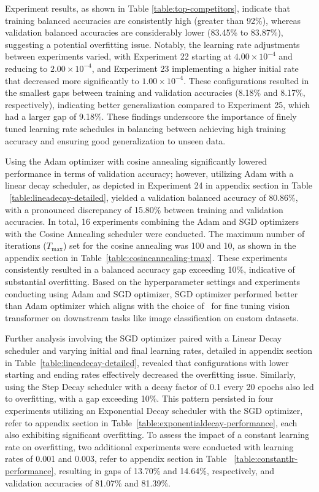 Experiment results, as shown in Table \ref{table:top-competitors}, indicate that training balanced accuracies are consistently high (greater than 92\%), whereas validation balanced accuracies are considerably lower (83.45\% to 83.87\%), suggesting a potential overfitting issue. Notably, the learning rate adjustments between experiments varied, with Experiment 22 starting at $4.00 \times 10^{-4}$ and reducing to $2.00 \times 10^{-4}$, and Experiment 23 implementing a higher initial rate that decreased more significantly to $1.00 \times 10^{-4}$. These configurations resulted in the smallest gaps between training and validation accuracies (8.18\% and 8.17\%, respectively), indicating better generalization compared to Experiment 25, which had a larger gap of 9.18\%. These findings underscore the importance of finely tuned learning rate schedules in balancing between achieving high training accuracy and ensuring good generalization to unseen data.

Using the Adam optimizer with cosine annealing significantly lowered performance in terms of validation accuracy; however, utilizing Adam with a linear decay scheduler, as depicted in Experiment 24 in appendix section in Table ~\ref{table:lineadecay-detailed}, yielded a validation balanced accuracy of 80.86\%, with a pronounced discrepancy of 15.80\% between training and validation accuracies. In total, 16 experiments combining the Adam and SGD optimizers with the Cosine Annealing scheduler were conducted. The maximum number of iterations (\(T_{\text{max}}\)) set for the cosine annealing was 100 and 10, as shown in the appendix section in Table~\ref{table:cosineannealing-tmax}. These experiments consistently resulted in a balanced accuracy gap exceeding 10\%, indicative of substantial overfitting. Based on the hyperparameter settings and experiments conducting using Adam and SGD optimizer, SGD optimizer performed better than Adam optimizer which aligns with the choice of~\citep{Vit_Paper_Dosovitskiy2020AnII} for fine tuning vision transformer on downstream tasks like image classification on custom datasets.

Further analysis involving the SGD optimizer paired with a Linear Decay scheduler and varying initial and final learning rates, detailed in appendix section in Table~\ref{table:lineadecay-detailed}, revealed that configurations with lower starting and ending rates effectively decreased the overfitting issue. Similarly, using the Step Decay scheduler with a decay factor of 0.1 every 20 epochs also led to overfitting, with a gap exceeding 10\%. This pattern persisted in four experiments utilizing an Exponential Decay scheduler with the SGD optimizer, refer to appendix section in Table~\ref{table:exponentialdecay-performance}, each also exhibiting significant overfitting. To assess the impact of a constant learning rate on overfitting, two additional experiments were conducted with learning rates of 0.001 and 0.003, refer to appendix section in Table ~\ref{table:constantlr-performance}, resulting in gaps of 13.70\% and 14.64\%, respectively, and validation accuracies of 81.07\% and 81.39\%.

